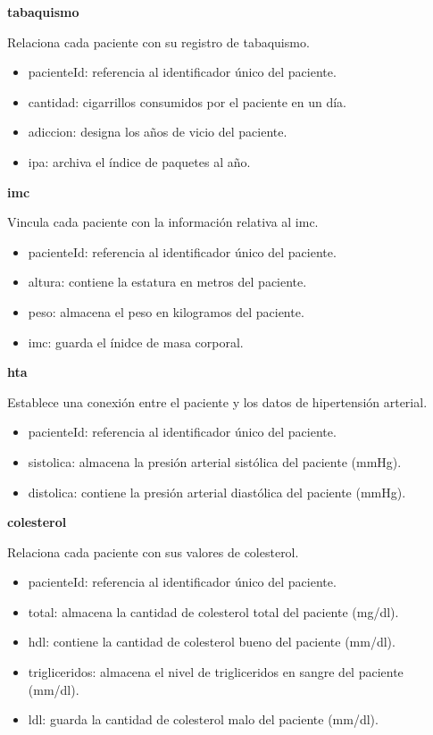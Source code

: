\documentclass[11pt,spanish,
		listoftables,listoffigures]
		{tfgplantilla}
\begin{document}
\noindent
\textbf {tabaquismo}

Relaciona cada paciente con su registro de tabaquismo.
\begin{itemize}
	\item pacienteId: referencia al identificador único del paciente.
	\item cantidad: cigarrillos consumidos por el paciente en un día.
	\item adiccion: designa los años de vicio del paciente.
	\item ipa: archiva el índice de paquetes al año.
\end{itemize}

\noindent
\textbf {imc}

Vincula cada paciente con la información relativa al imc.
\begin{itemize}
	\item pacienteId: referencia al identificador único del paciente.
	\item altura: contiene la estatura en metros del paciente.
	\item peso: almacena el peso en kilogramos del paciente.
	\item imc: guarda el ínidce de masa corporal.
\end{itemize}

\noindent
\textbf {hta}

Establece una conexión entre el paciente y los datos de hipertensión arterial.
\begin{itemize}
	\item pacienteId: referencia al identificador único del paciente.
	\item sistolica: almacena la presión arterial sistólica del paciente (mmHg).
	\item distolica: contiene la presión arterial diastólica del paciente (mmHg).
\end{itemize}

\noindent
\textbf {colesterol}

Relaciona cada paciente con sus valores de colesterol.
\begin{itemize}
	\item pacienteId: referencia al identificador único del paciente. 
	\item total: almacena la cantidad de colesterol total del paciente (mg/dl).
	\item hdl: contiene la cantidad de colesterol bueno del paciente (mm/dl).
	\item trigliceridos: almacena el nivel de trigliceridos en sangre del paciente (mm/dl).
	\item ldl: guarda la cantidad de colesterol malo del paciente (mm/dl).
\end{itemize}
\end{document}
